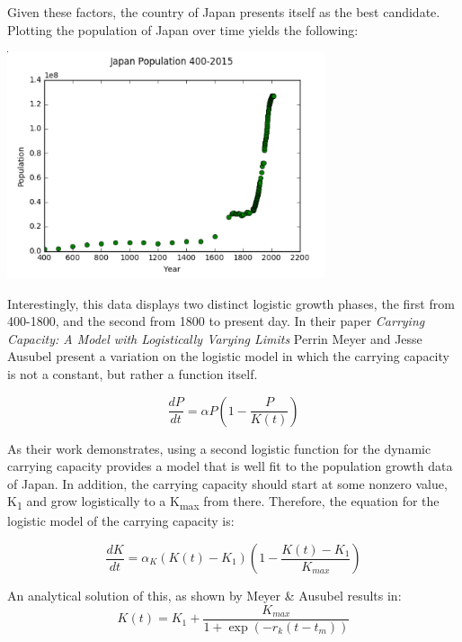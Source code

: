 \documentclass[12pt]{article}
\begin{document}
Given these factors, the country of Japan presents itself as the best candidate. Plotting the population of Japan\cite{japan} over time yields the following: 


\begin{minipage}{\textwidth}
		\centering
		\includegraphics[width=0.7\textwidth]{japan}
\end{minipage}\hfill




Interestingly, this data\cite{japan} displays two distinct logistic growth phases, the first from 400-1800, and the second from 1800 to present day. In their paper \textit{Carrying Capacity: A Model with Logistically Varying Limits} Perrin Meyer and Jesse Ausubel present a variation on the logistic model in which the carrying capacity is not a constant, but rather a function itself\cite{cc}. 


\begin{equation} \frac{dP}{dt} = \alpha P(1-\frac{P}{K(t)}) \end{equation}


As their work demonstrates, using a second logistic function for the dynamic carrying capacity provides a model that is well fit to the population growth data of Japan. In addition, the carrying capacity should start at some nonzero value, K\textsubscript{1}  and grow logistically to a K\textsubscript{max} from there. Therefore, the equation for the logistic model of the carrying capacity is: 


\begin{equation} \frac{dK}{dt} = \alpha_{K}(K(t)-K_{1})(1-\frac{K(t)-K_{1}}{K_{max}}) \end{equation}


An analytical solution of this, as shown by Meyer \& Ausubel\cite{cc} results in:
\begin{equation} K(t) = K_{1}+ \frac{K_{max}}{1+\exp(-r_{k}(t-t_{m}))}
\end{equation}
 
\end{document}
